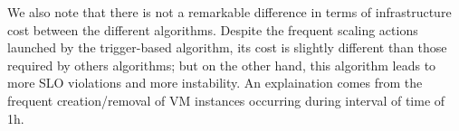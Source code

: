 
We also note that there is not a remarkable difference in terms of infrastructure cost between the 
different algorithms. Despite the frequent scaling actions launched by the trigger-based algorithm, its cost is slightly different than those required by others algorithms; but on the other hand, this algorithm leads to more SLO violations and more
instability. An explaination comes from the frequent creation/removal of VM instances occurring during interval of time of 1h.




	
